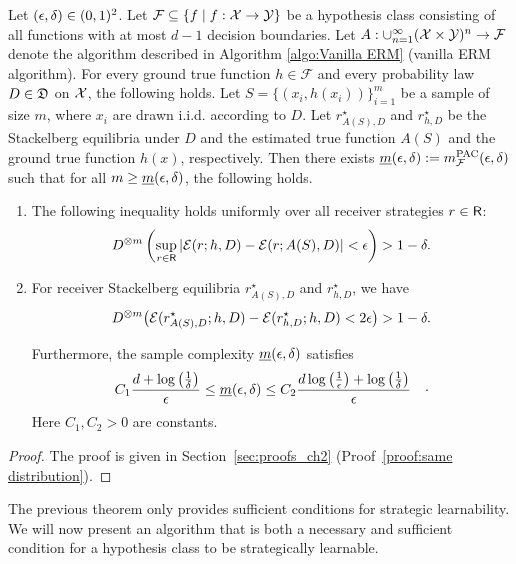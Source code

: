 \begin{lem}\label{lem:same distribution}
Let $(\epsilon, \delta) \in (0,1)^2$.
Let $\mathcal{F} \subseteq \{ f \mid f: \mathcal{X} \rightarrow \mathcal{Y} \}$ be a hypothesis class consisting of all functions with at most $d-1$ decision boundaries. Let $A: \cup_{n=1}^\infty (\mathcal{X} \times \mathcal{Y})^n \rightarrow \mathcal{F}$ denote the algorithm described in Algorithm \ref{algo:Vanilla ERM} (vanilla ERM algorithm).
For every ground true function $h \in \mathcal{F}$ and every probability law $D \in \mathfrak{D}$ on $\mathcal{X}$, the following holds. Let $S = \{(x_i, h(x_i))\}_{i=1}^m$ be a sample of size $m$, where $x_i$ are drawn i.i.d. according to $D$. Let $r^\star_{A(S),D}$ and $r^\star_{h,D}$ be the Stackelberg equilibria under $D$ and the estimated true function $A(S)$ and the ground true function $h(x)$, respectively. Then there exists $\underline{m}(\epsilon,\delta) := m_{\mathcal{F}}^{\mathrm{PAC}}(\epsilon,\delta)$ such that for all $m \geq \underline{m}(\epsilon,\delta)$, the following holds.

\begin{enumerate}[label=(\alph*)]
    \item \label{lem:same distribution (a)} The following inequality holds uniformly over all receiver strategies $r \in \mathsf{R}$:
    \begin{equation*}
        D^{\otimes m}\left(\sup_{r \in \mathsf{R}} |\mathcal{E}(r; h,D) - \mathcal{E}(r; A(S), D)| < \epsilon\right) > 1 - \delta.
    \end{equation*}

    \item \label{lem:same distribution (b)} For receiver Stackelberg equilibria $r^\star_{A(S),D}$ and $r^\star_{h,D}$, we have \begin{equation}\label{eqn:lem:vanilla ERM PAC bound}
    D^{\otimes m}\big(\mathcal{E}(r^\star_{A(S),D}; h,D) - \mathcal{E}(r^\star_{h,D}; h, D) < 2\epsilon\big) > 1 - \delta.
\end{equation}

Furthermore, the sample complexity $\underline{m}(\epsilon,\delta)$ satisfies
\begin{equation}\label{eqn:sample complexity:lem:same distribution}
    \begin{aligned}
        C_1 \frac{d + \log\left(\frac{1}{\delta}\right)}{\epsilon} &\leq \underline{m}(\epsilon,\delta) \leq C_2 \frac{d \log\left(\frac{1}{\epsilon}\right) + \log\left(\frac{1}{\delta}\right)}{\epsilon}
    \end{aligned}.
\end{equation}
Here $C_1, C_2 > 0$ are constants.
\end{enumerate}

\end{lem}


\begin{proof} The proof is given in Section~\ref{sec:proofs_ch2} (Proof~\ref{proof:same distribution}).
\end{proof}

The previous theorem only provides sufficient conditions for strategic learnability. We will now present an algorithm that is both a necessary and sufficient condition for a hypothesis class to be strategically learnable.
